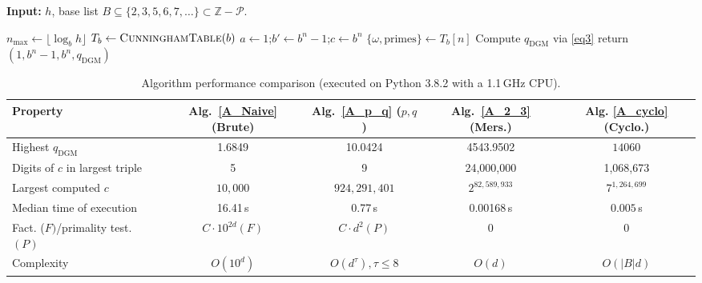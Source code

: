 \documentclass[11pt,letterpaper]{amsart}
\def\Z{\mathbb{Z}}
\def\Z{\mathbb{Z}}
\begin{document}
\begin{algorithm}[!t]
\caption{Cyclotomic Algorithm\label{A_cyclo}}
\hspace*{\algorithmicindent}\textbf{Input:} $h$, base list $B\subseteq\{2,3,5,6,7,\dots\} \subset \Z - \mathcal{P}$.
\begin{algorithmic}[1]
  \State $n_{\max}\gets\lfloor\log_b h\rfloor$
  \State $T_b\gets\textsc{CunninghamTable}(b)$ 
    \State $a\gets 1$;\quad $b'\gets b^n-1$;\quad $c\gets b^n$
    \State $\{\omega,\text{primes}\}\gets T_b[n]$ 
    \State Compute $q_{\mathrm{DGM}}$ via \eqref{eq3}
      \State return $(1, b^n - 1,b^n , q_{\mathrm{DGM}})$
    \EndIf
  \EndFor
\EndFor
\end{algorithmic}
\end{algorithm}


\begin{table}[t]
\centering
\begin{tabular}{|l|c|c|c|c|}
\hline
\textbf{Property} & \textbf{Alg.\ \ref{A_Naive} (Brute)} & \textbf{Alg.\ \ref{A_p_q} ($p,q$)} & \textbf{Alg.\ \ref{A_2_3} (Mers.)} & \textbf{Alg. \ref{A_cyclo} \textbf{(Cyclo.)}} \\
\hline
Highest $q_{\mathrm{DGM}}$ & 1.6849 & 10.0424 & 4543.9502 & $14060$ \\
Digits of $c$ in largest triple & 5 & 9 & 24{,}000{,}000 & 1{,}068{,}673 \\
Largest computed $c$ & $10{,}000$ & $924{,}291{,}401$ & $2^{82{,}589{,}933}$ & $7^{1{,}264{,}699}$ \\
Median time of execution & 16.41\,s & 0.77\,s & 0.00168\,s & $0.005\,$s \\
Fact. ($F)$/primality test. $(P)$ & $C\cdot 10^{2d} (F)$ & $C\cdot d^2 (P)$ & $0$ & $0$\\
Complexity & $O(10^d)$ & $O(d^{\tau}), \tau \leq 8$ & $O(d)$ & $O(|B|d)$ \\
\hline
\end{tabular}
\caption{Algorithm performance comparison (executed on Python 3.8.2 with a 1.1\,GHz CPU).\label{Alg_tab}}
\end{table}
\end{document}

